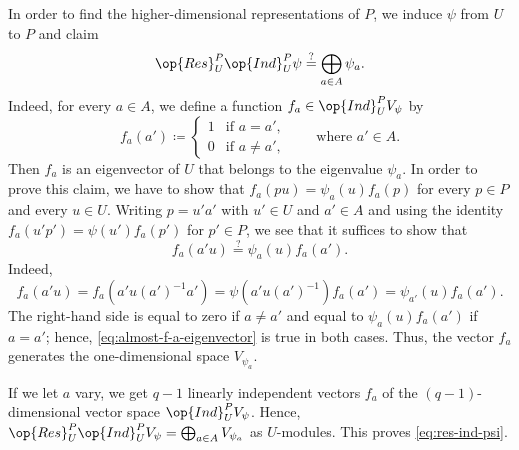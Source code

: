 \documentclass[../main.tex]{subfiles}
\begin{document}
In order to find the higher-dimensional representations of $P$, we induce $\psi$ from $U$ to $P$ and claim
\begin{equation}
	\op{Res}^P_U\op{Ind}^P_U\psi\stackrel?=\bigoplus_{a\in A}\psi_a. \label{eq:res-ind-psi}
\end{equation}
Indeed, for every $a\in A$, we define a function $f_a\in\op{Ind}^P_UV_\psi$ by
\[f_a(a')\coloneqq\begin{cases}
	1 & \text{if }a=a', \\
	0 & \text{if }a\ne a',
\end{cases}\qquad\text{where }a'\in A.\]
Then $f_a$ is an eigenvector of $U$ that belongs to the eigenvalue $\psi_a$. In order to prove this claim, we have to show that $f_a(pu)=\psi_a(u)f_a(p)$ for every $p\in P$ and every $u\in U$. Writing $p=u'a'$ with $u'\in U$ and $a'\in A$ and using the identity $f_a(u'p')=\psi(u')f_a(p')$ for $p'\in P$, we see that it suffices to show that
\begin{equation}
	f_a(a'u)\stackrel?=\psi_a(u)f_a(a'). \label{eq:almost-f-a-eigenvector}
\end{equation}
Indeed,
\[f_a(a'u)=f_a\left(a'u(a')^{-1}a'\right)=\psi\left(a'u(a')^{-1}\right)f_a(a')=\psi_{a'}(u)f_a(a').\]
The right-hand side is equal to zero if $a\ne a'$ and equal to $\psi_a(u)f_a(a')$ if $a=a'$; hence, \eqref{eq:almost-f-a-eigenvector} is true in both cases. Thus, the vector $f_a$ generates the one-dimensional space $V_{\psi_a}$.

If we let $a$ vary, we get $q-1$ linearly independent vectors $f_a$ of the $(q-1)$-dimensional vector space $\op{Ind}^P_UV_\psi$. Hence, $\op{Res}^P_U\op{Ind}^P_UV_\psi=\bigoplus_{a\in A}V_{\psi_a}$ as $U$-modules. This proves \eqref{eq:res-ind-psi}.
\end{document}
